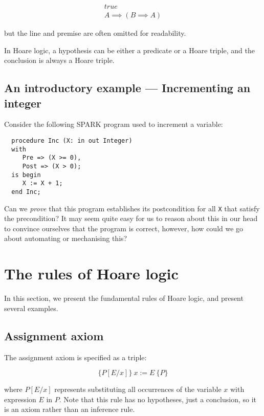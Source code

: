 \begin{displaymath}
 \begin{array}{c}
  true\\
 \hline
  A \implies (B \implies A)
 \end{array}
\end{displaymath}

\noindent but the line and premise are often omitted for readability.

In Hoare logic, a hypothesis can be either a predicate or a Hoare triple, and the conclusion is always a Hoare triple.

\subsection{An introductory example --- Incrementing an integer}

Consider the following SPARK program used to increment a variable:

\lstset{aboveskip=3mm}
\begin{lstlisting}
  procedure Inc (X: in out Integer)
  with
     Pre => (X >= 0),
     Post => (X > 0);
  is begin
     X := X + 1;
  end Inc;
\end{lstlisting}

Can we {\em prove} that this program establishes its postcondition  for all {\tt X} that satisfy the precondition? It may seem quite easy for us to reason about this in our head to convince ourselves that the program is correct, however, how could we go about automating or mechanising this?


\section{The rules of Hoare logic}

In this section, we present the fundamental rules of Hoare logic, and present several examples.

\subsection{Assignment axiom}

The assignment axiom is specified as a triple:

\begin{displaymath}
  \{P[E/x]\}~ x := E~ \{P\}
\end{displaymath}

where \(P[E/x]\) represents substituting all occurrences of the variable \(x\) with expression \(E\) in \(P\). Note that this rule has no hypotheses, just a conclusion, so it is an axiom rather than an inference rule. 

